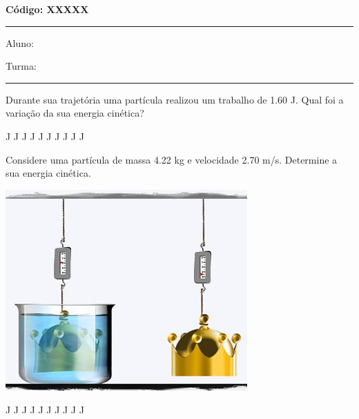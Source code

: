 \documentclass[12pt, addpoints]{exam}
\begin{document}
\begin{minipage}[r]{0.5\linewidth}
    \begin{flushright}
        {\bf \Large Código: XXXXX}
    \end{flushright}
\end{minipage}
\vspace{1cm} \hrule \vspace{0.5cm}
\begin{minipage}{0.70\linewidth}
    Aluno:
\end{minipage}
\begin{minipage}{0.25\linewidth}
    Turma:
\end{minipage}
\vspace{0.5cm} \hrule \vspace{0.5cm}

\begin{questions}
\begin{multicols*}{2}
\question[33] Durante sua trajetória uma partícula realizou um trabalho de    1.60 J. Qual foi a variação da sua energia cinética?

\begin{oneparchoices}
 J J J J J J J J J J\end{oneparchoices}
\question[23] Considere uma partícula de massa    4.22 kg e velocidade    2.70 m/s. Determine a sua energia cinética.

\begin{center}
\begin{minipage}[c]{0.75\linewidth}
\includegraphics[width=\textwidth]{MWE001.jpg}
\end{minipage}

\end{center}
\begin{oneparchoices}
 J J J J J J J J J J\end{oneparchoices}
\end{multicols*}
\end{questions}
\newpage
\end{document}
